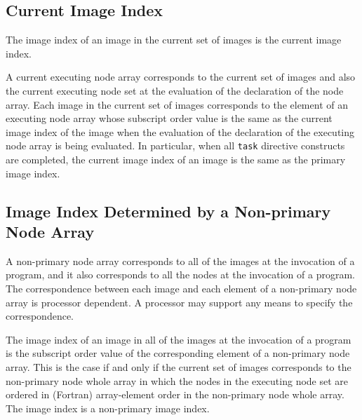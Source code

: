 \subsection{Current Image Index}

The image index of an image in the current set of images is
the current image index.

A current executing node array corresponds to the 
current set of images and also the current executing node set 
at the evaluation of the declaration of the node array.
Each image in the current set of images corresponds 
to the element of an executing node array whose
subscript order value is the same as the current image index
of the image when the evaluation of the declaration of the executing
node array is being evaluated.
In particular, when all {\tt task} directive constructs are 
completed, the current image index of an image is the same as the
primary image index.



\subsection{Image Index Determined by a Non-primary Node Array}


A non-primary node array corresponds to all of the images at the
invocation of a program, and it also corresponds to all the nodes at the
invocation of 
a program. The correspondence between each image and 
each element of a non-primary node array is processor dependent.
A processor may support any means to specify the correspondence.

The image index of an image in all of the images at the invocation 
of a program is the subscript order value of the corresponding element
of a non-primary node array. This is the case if and only if the current
set of images 
corresponds to the non-primary node whole array in which
the nodes in the executing node set are ordered in (Fortran)
array-element order in the non-primary node whole array.
The image index is a non-primary image index. 

